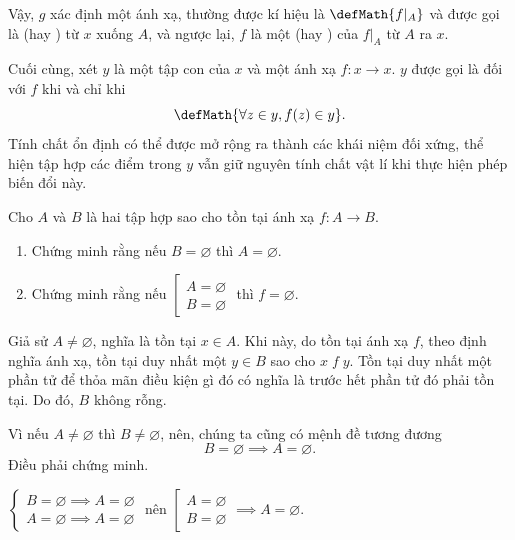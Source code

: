 Vậy, $g$ xác định một ánh xạ, thường được kí hiệu là $\defMath{f|_A}$ và được gọi là  (hay ) từ $x$ xuống $A$, và ngược lại, $f$ là một  (hay ) của $f|_A$ từ $A$ ra $x$.

Cuối cùng, xét $y$ là một tập con của $x$ và một ánh xạ $f: x \to x$. $y$ được gọi là  đối với $f$ khi và chỉ khi \begin{equation*}
   \defMath{\forall z \in y, f(z) \in y}.
\end{equation*}
Tính chất ổn định có thể được mở rộng ra thành các khái niệm đối xứng, thể hiện tập hợp các điểm trong $y$ vẫn giữ nguyên tính chất vật lí khi thực hiện phép biến đổi này.

\exercise Cho $A$ và $B$ là hai tập hợp sao cho tồn tại ánh xạ $f: A \to B$.
\begin{enumerate}
   \item Chứng minh rằng nếu $B = \varnothing$ thì $A = \varnothing$.
   \item Chứng minh rằng nếu $\left[\begin{aligned}
      A = \varnothing \\ B = \varnothing
   \end{aligned}\right.$ thì $f = \varnothing$.
\end{enumerate}

\solution

\resetSubexercise Giả sử $A \neq \varnothing$, nghĩa là tồn tại $x \in A$. Khi này, do tồn tại ánh xạ $f$, theo định nghĩa ánh xạ, tồn tại duy nhất một $y \in B$ sao cho $x\;f\;y$. Tồn tại duy nhất một phần tử để thỏa mãn điều kiện gì đó có nghĩa là trước hết phần tử đó phải tồn tại. Do đó, $B$ không rỗng.

Vì nếu $A \neq \varnothing$ thì $B \neq \varnothing$, nên, chúng ta cũng có mệnh đề tương đương
\begin{equation*}
   B = \varnothing \implies A = \varnothing.
\end{equation*}
Điều phải chứng minh.

\stepSubexercise $\begin{cases}
   B = \varnothing \implies A = \varnothing \\
   A = \varnothing \implies A = \varnothing
\end{cases}$ nên $\left[\begin{aligned}
   A = \varnothing \\ B = \varnothing
\end{aligned}\right. \implies A = \varnothing$. 


